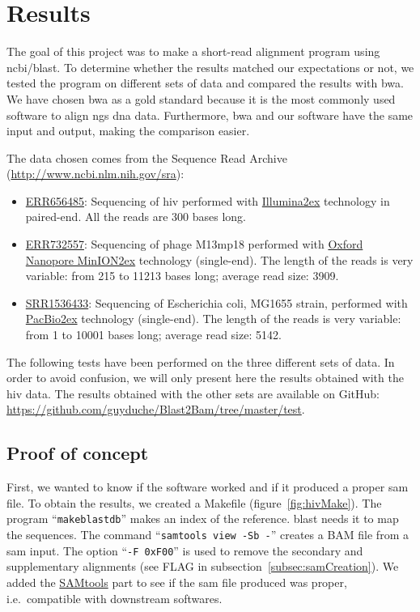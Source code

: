 \chapter{Results}
\label{ch:results}
The goal of this project was to make a short-read alignment program using \gls{ncbi}\slash\gls{blast}.
To determine whether the results matched our expectations or not, we tested the program on different sets of data and compared the results with \gls{bwa}.
We have chosen \gls{bwa} as a gold standard because it is the most commonly used software to align \gls{ngs} \gls{dna} data.
Furthermore, \gls{bwa} and our software have the same input and output, making the comparison easier.

The data chosen comes from the Sequence Read Archive (\url{http://www.ncbi.nlm.nih.gov/sra}):
\begin{itemize}
    \item \href{http://www.ncbi.nlm.nih.gov/sra/ERR656485}{ERR656485}: Sequencing of \gls{hiv} performed with \href{http://www.illumina.com/}{Illumina\ttfamily\tiny\raise 2ex\hbox{\textregistered}} technology in paired-end. All the reads are 300 bases long.
    \item \href{http://www.ncbi.nlm.nih.gov/sra/ERR732557}{ERR732557}: Sequencing of phage M13mp18 performed with \href{https://nanoporetech.com/products-services/minion-mki}{Oxford Nanopore MinION\ttfamily\tiny\raise 2ex\hbox{\texttrademark}} technology (single-end). The length of the reads is very variable: from 215 to 11213 bases long; average read size: 3909.
    \item \href{http://www.ncbi.nlm.nih.gov/sra/SRR1536433}{SRR1536433}: Sequencing of Escherichia coli, MG1655 strain, performed with \href{http://www.pacificbiosciences.com/}{PacBio\ttfamily\tiny\raise 2ex\hbox{\textregistered}} technology (single-end). The length of the reads is very variable: from 1 to 10001 bases long; average read size: 5142.
\end{itemize}

The following tests have been performed on the three different sets of data.
In order to avoid confusion, we will only present here the results obtained with the \gls{hiv} data.
The results obtained with the other sets are available on GitHub: \url{https://github.com/guyduche/Blast2Bam/tree/master/test}.


\section{Proof of concept}
First, we wanted to know if the software worked and if it produced a proper \gls{sam} file.
To obtain the results, we created a Makefile (figure~\ref{fig:hivMake}).
The program ``\texttt{makeblastdb}'' makes an index of the reference. \gls{blast} needs it to map the sequences.
The command ``\texttt{samtools view -Sb -}'' creates a BAM file from a \gls{sam} input.
The option ``\texttt{-F 0xF00}'' is used to remove the secondary and supplementary alignments (see FLAG in subsection~\ref{subsec:samCreation}).
We added the \href{http://www.htslib.org/}{SAMtools} part to see if the \gls{sam} file produced was proper, i.e.~compatible with downstream softwares.

